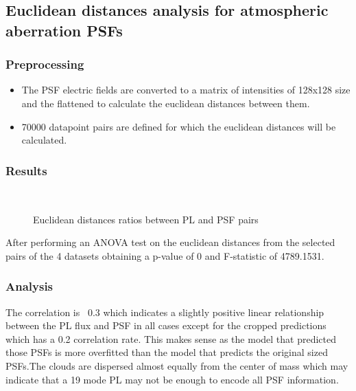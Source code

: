 \subsection{Euclidean distances analysis for atmospheric aberration PSFs}

	\subsubsection{Preprocessing}
		
		\begin{itemize}
			\item The PSF electric fields are converted to a matrix of intensities of 128x128 size and the flattened to calculate the euclidean distances between them.
			\item 70000 datapoint pairs are defined for which the euclidean distances will be calculated.
		\end{itemize}
		
	\subsubsection{Results}
	
		\begin{figure*}[ht!]
			\centering
			\\
			\caption{Euclidean distances ratios between PL and PSF pairs}\hspace{\fill}
		\end{figure*}
		
		After performing an ANOVA test on the euclidean distances from the selected pairs of the 4 datasets obtaining a p-value of 0 and F-statistic of 4789.1531.
		
	\subsubsection{Analysis}
		The correlation is ~0.3 which indicates a slightly positive linear relationship between the PL flux and PSF in all cases except for the cropped predictions which has a 0.2 correlation rate. This makes sense as the model that predicted those PSFs is more overfitted than the model that predicts the original sized PSFs.The clouds are dispersed almost equally from the center of mass which may indicate that a 19 mode PL may not be enough to encode all PSF information. 
